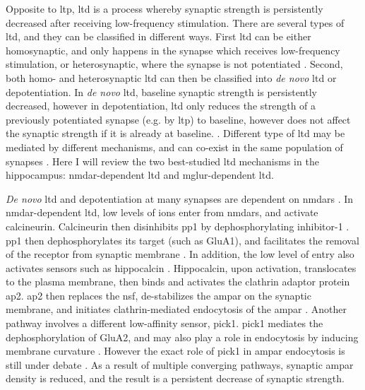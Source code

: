 Opposite to \gls{ltp}, \gls{ltd} is a process whereby synaptic strength is persistently decreased after receiving low-frequency stimulation. There are several types of \gls{ltd}, and they can be classified in different ways. First \gls{ltd} can be either homosynaptic, and only happens in the synapse which receives low-frequency stimulation, or heterosynaptic, where the synapse is not potentiated . Second, both homo- and heterosynaptic \gls{ltd} can then be classified into \textit{de novo} \gls{ltd} or depotentiation. In \textit{de novo} \gls{ltd}, baseline synaptic strength is persistently decreased, however in depotentiation, \gls{ltd} only reduces the strength of a previously potentiated synapse (e.g. by \gls{ltp}) to baseline, however does not affect the synaptic strength if it is already at baseline. \citep{collingridge10}. Different type of \gls{ltd} may be mediated by different mechanisms, and can co-exist in the same population of synapses \citep{collingridge10}. Here I will review the two best-studied \gls{ltd} mechanisms in the hippocampus: \gls{nmdar}-dependent \gls{ltd} and \gls{mglur}-dependent \gls{ltd}.

\textit{De novo} \gls{ltd} and depotentiation at many synapses are dependent on \glspl{nmdar} \citep{collingridge83, dudek92}. In \gls{nmdar}-dependent \gls{ltd}, low levels of  ions enter from \glspl{nmdar}, and activate calcineurin. Calcineurin then disinhibits \gls{pp1} by dephosphorylating inhibitor-1 \citep{mulkey93}. \Gls{pp1} then dephosphorylates its target (such as GluA1), and facilitates the removal of the receptor from synaptic membrane \citep{collingridge04}. In addition, the low level of  entry also activates  sensors such as hippocalcin \citep{palmer05}. Hippocalcin, upon activation, translocates to the plasma membrane, then binds and activates the clathrin adaptor protein \gls{ap2}. \Gls{ap2} then replaces the \gls{nsf}, de-stabilizes the \gls{ampar} on the synaptic membrane, and initiates clathrin-mediated endocytosis of the \gls{ampar} \citep{collingridge04, palmer05}. Another pathway involves a different low-affinity  sensor, \gls{pick1}. \Gls{pick1} mediates the dephosphorylation of GluA2, and may also play a role in endocytosis by inducing membrane curvature \citep{collingridge04, lin07}. However the exact role of \gls{pick1} in \gls{ampar} endocytosis is still under debate \citep{collingridge10}. As a result of multiple converging pathways, synaptic \gls{ampar} density is reduced, and the result is a persistent decrease of synaptic strength.

